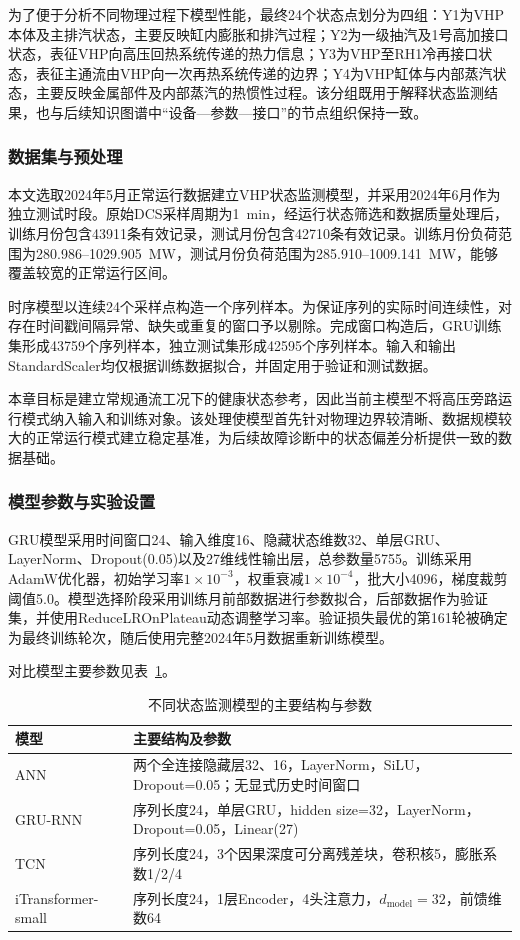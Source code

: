 为了便于分析不同物理过程下模型性能，最终24个状态点划分为四组：Y1为VHP本体及主排汽状态，主要反映缸内膨胀和排汽过程；Y2为一级抽汽及1号高加接口状态，表征VHP向高压回热系统传递的热力信息；Y3为VHP至RH1冷再接口状态，表征主通流由VHP向一次再热系统传递的边界；Y4为VHP缸体与内部蒸汽状态，主要反映金属部件及内部蒸汽的热惯性过程。该分组既用于解释状态监测结果，也与后续知识图谱中“设备—参数—接口”的节点组织保持一致。

\subsubsection{数据集与预处理}

本文选取2024年5月正常运行数据建立VHP状态监测模型，并采用2024年6月作为独立测试时段。原始DCS采样周期为1~min，经运行状态筛选和数据质量处理后，训练月份包含43911条有效记录，测试月份包含42710条有效记录。训练月份负荷范围为280.986--1029.905~MW，测试月份负荷范围为285.910--1009.141~MW，能够覆盖较宽的正常运行区间。

时序模型以连续24个采样点构造一个序列样本。为保证序列的实际时间连续性，对存在时间戳间隔异常、缺失或重复的窗口予以剔除。完成窗口构造后，GRU训练集形成43759个序列样本，独立测试集形成42595个序列样本。输入和输出StandardScaler均仅根据训练数据拟合，并固定用于验证和测试数据。

本章目标是建立常规通流工况下的健康状态参考，因此当前主模型不将高压旁路运行模式纳入输入和训练对象。该处理使模型首先针对物理边界较清晰、数据规模较大的正常运行模式建立稳定基准，为后续故障诊断中的状态偏差分析提供一致的数据基础。

\subsubsection{模型参数与实验设置}

GRU模型采用时间窗口24、输入维度16、隐藏状态维数32、单层GRU、LayerNorm、Dropout(0.05)以及27维线性输出层，总参数量5755。训练采用AdamW优化器，初始学习率$1\times10^{-3}$，权重衰减$1\times10^{-4}$，批大小4096，梯度裁剪阈值5.0。模型选择阶段采用训练月前部数据进行参数拟合，后部数据作为验证集，并使用ReduceLROnPlateau动态调整学习率。验证损失最优的第161轮被确定为最终训练轮次，随后使用完整2024年5月数据重新训练模型。

对比模型主要参数见表~\ref{tab:model_settings_v2}。

\begin{table}[htbp]
\centering
\caption{不同状态监测模型的主要结构与参数}
\label{tab:model_settings_v2}
\small
\begin{tabular}{lp{10.5cm}}
\toprule
模型 & 主要结构及参数\\
\midrule
ANN & 两个全连接隐藏层32、16，LayerNorm，SiLU，Dropout=0.05；无显式历史时间窗口\\
GRU-RNN & 序列长度24，单层GRU，hidden size=32，LayerNorm，Dropout=0.05，Linear(27)\\
TCN & 序列长度24，3个因果深度可分离残差块，卷积核5，膨胀系数1/2/4\\
iTransformer-small & 序列长度24，1层Encoder，4头注意力，$d_{\mathrm{model}}=32$，前馈维数64\\
\bottomrule
\end{tabular}
\end{table}

